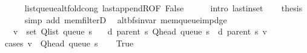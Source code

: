 \begin{isabellebody}
\ \ \ \ \isamarkupfalse%
\ list{\isacharunderscore}{\kern0pt}queue{\isacharunderscore}{\kern0pt}alt{\isacharunderscore}{\kern0pt}fold{\isacharunderscore}{\kern0pt}cong\ last{\isacharunderscore}{\kern0pt}appendR{\isacharbrackleft}{\kern0pt}OF\ False{\isacharbrackright}{\kern0pt}\isanewline
\ \ \ \ \isamarkupfalse%
\ {\isacharparenleft}{\kern0pt}intro\ last{\isacharunderscore}{\kern0pt}in{\isacharunderscore}{\kern0pt}set{\isacharparenright}{\kern0pt}\isanewline
\ \ \isamarkupfalse%
\ {\isacharquery}{\kern0pt}thesis\isanewline
\ \ \ \ \isamarkupfalse%
\ {\isacharparenleft}{\kern0pt}simp\ add{\isacharcolon}{\kern0pt}\ mem{\isacharunderscore}{\kern0pt}filterD{\isacharparenleft}{\kern0pt}{}{\isacharparenright}{\kern0pt}{\isacharparenright}{\kern0pt}\isanewline
{}\isamarkupfalse%
%
\endisatagproof
{\isafoldproof}%
%
\isadelimproof
\isanewline
%
\endisadelimproof
%
\isadeliminvisible
\isanewline
%
\endisadeliminvisible
%
\isataginvisible
{}\isamarkupfalse%
\ {\isacharparenleft}{\kern0pt}\ alt{\isacharunderscore}{\kern0pt}bfs{\isacharunderscore}{\kern0pt}invar{\isacharparenright}{\kern0pt}\ mem{\isacharunderscore}{\kern0pt}queue{\isacharunderscore}{\kern0pt}imp{\isacharunderscore}{\kern0pt}d{\isacharunderscore}{\kern0pt}ge{\isacharcolon}{\kern0pt}\isanewline
\ \ \ {\isachardoublequoteopen}v\ {\isasymin}\ set\ {\isacharparenleft}{\kern0pt}Q{\isacharunderscore}{\kern0pt}list\ {\isacharparenleft}{\kern0pt}queue\ s{\isacharparenright}{\kern0pt}{\isacharparenright}{\kern0pt}{\isachardoublequoteclose}\isanewline
\ \ \ {\isachardoublequoteopen}d\ {\isacharparenleft}{\kern0pt}parent\ s{\isacharparenright}{\kern0pt}\ {\isacharparenleft}{\kern0pt}Q{\isacharunderscore}{\kern0pt}head\ {\isacharparenleft}{\kern0pt}queue\ s{\isacharparenright}{\kern0pt}{\isacharparenright}{\kern0pt}\ {\isasymle}\ d\ {\isacharparenleft}{\kern0pt}parent\ s{\isacharparenright}{\kern0pt}\ v{\isachardoublequoteclose}%
\endisataginvisible
{\isafoldinvisible}%
%
\isadeliminvisible
\isanewline
%
\endisadeliminvisible
%
\isadelimproof
%
\endisadelimproof
%
\isatagproof
{}\isamarkupfalse%
\ {\isacharparenleft}{\kern0pt}cases\ {\isachardoublequoteopen}v\ {\isacharequal}{\kern0pt}\ Q{\isacharunderscore}{\kern0pt}head\ {\isacharparenleft}{\kern0pt}queue\ s{\isacharparenright}{\kern0pt}{\isachardoublequoteclose}{\isacharparenright}{\kern0pt}\isanewline
\ \ \isamarkupfalse%
\ True\isanewline
\ \ \isamarkupfalse%

\end{isabellebody}

